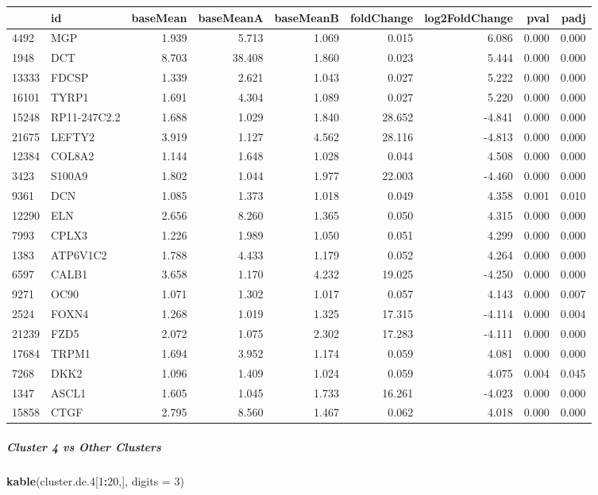 \documentclass[]{article}
\newenvironment{Shaded}{\begin{snugshade}}{\end{snugshade}}
\newcommand{\DataTypeTok}[1]{\textcolor[rgb]{0.13,0.29,0.53}{#1}}
\newcommand{\DecValTok}[1]{\textcolor[rgb]{0.00,0.00,0.81}{#1}}
\newcommand{\FloatTok}[1]{\textcolor[rgb]{0.00,0.00,0.81}{#1}}
\newcommand{\KeywordTok}[1]{\textcolor[rgb]{0.13,0.29,0.53}{\textbf{#1}}}
\newcommand{\NormalTok}[1]{#1}
\newcommand{\OperatorTok}[1]{\textcolor[rgb]{0.81,0.36,0.00}{\textbf{#1}}}
\let\oldsubparagraph\subparagraph
\renewcommand{\subparagraph}[1]{\oldsubparagraph{#1}\mbox{}}
\begin{document}
\begin{longtable}[]{@{}llrrrrrrr@{}}
\toprule
& id & baseMean & baseMeanA & baseMeanB & foldChange & log2FoldChange &
pval & padj\tabularnewline
\midrule
\endhead
4492 & MGP & 1.939 & 5.713 & 1.069 & 0.015 & 6.086 & 0.000 &
0.000\tabularnewline
1948 & DCT & 8.703 & 38.408 & 1.860 & 0.023 & 5.444 & 0.000 &
0.000\tabularnewline
13333 & FDCSP & 1.339 & 2.621 & 1.043 & 0.027 & 5.222 & 0.000 &
0.000\tabularnewline
16101 & TYRP1 & 1.691 & 4.304 & 1.089 & 0.027 & 5.220 & 0.000 &
0.000\tabularnewline
15248 & RP11-247C2.2 & 1.688 & 1.029 & 1.840 & 28.652 & -4.841 & 0.000 &
0.000\tabularnewline
21675 & LEFTY2 & 3.919 & 1.127 & 4.562 & 28.116 & -4.813 & 0.000 &
0.000\tabularnewline
12384 & COL8A2 & 1.144 & 1.648 & 1.028 & 0.044 & 4.508 & 0.000 &
0.000\tabularnewline
3423 & S100A9 & 1.802 & 1.044 & 1.977 & 22.003 & -4.460 & 0.000 &
0.000\tabularnewline
9361 & DCN & 1.085 & 1.373 & 1.018 & 0.049 & 4.358 & 0.001 &
0.010\tabularnewline
12290 & ELN & 2.656 & 8.260 & 1.365 & 0.050 & 4.315 & 0.000 &
0.000\tabularnewline
7993 & CPLX3 & 1.226 & 1.989 & 1.050 & 0.051 & 4.299 & 0.000 &
0.000\tabularnewline
1383 & ATP6V1C2 & 1.788 & 4.433 & 1.179 & 0.052 & 4.264 & 0.000 &
0.000\tabularnewline
6597 & CALB1 & 3.658 & 1.170 & 4.232 & 19.025 & -4.250 & 0.000 &
0.000\tabularnewline
9271 & OC90 & 1.071 & 1.302 & 1.017 & 0.057 & 4.143 & 0.000 &
0.007\tabularnewline
2524 & FOXN4 & 1.268 & 1.019 & 1.325 & 17.315 & -4.114 & 0.000 &
0.004\tabularnewline
21239 & FZD5 & 2.072 & 1.075 & 2.302 & 17.283 & -4.111 & 0.000 &
0.000\tabularnewline
17684 & TRPM1 & 1.694 & 3.952 & 1.174 & 0.059 & 4.081 & 0.000 &
0.000\tabularnewline
7268 & DKK2 & 1.096 & 1.409 & 1.024 & 0.059 & 4.075 & 0.004 &
0.045\tabularnewline
1347 & ASCL1 & 1.605 & 1.045 & 1.733 & 16.261 & -4.023 & 0.000 &
0.000\tabularnewline
15858 & CTGF & 2.795 & 8.560 & 1.467 & 0.062 & 4.018 & 0.000 &
0.000\tabularnewline
\bottomrule
\end{longtable}

\hypertarget{cluster-4-vs-other-clusters}{%
\subparagraph{Cluster 4 vs Other
Clusters}\label{cluster-4-vs-other-clusters}}

\begin{Shaded}
\begin{Highlighting}[]
\KeywordTok{kable}\NormalTok{(cluster.de}\FloatTok{.4}\NormalTok{[}\DecValTok{1}\OperatorTok{:}\DecValTok{20}\NormalTok{,], }\DataTypeTok{digits =} \DecValTok{3}\NormalTok{)}
\end{Highlighting}
\end{Shaded}
\end{document}
